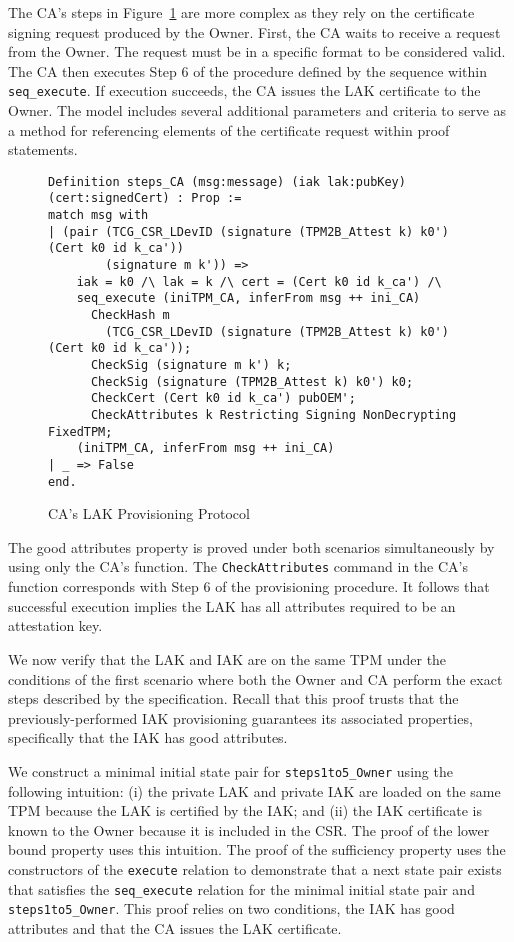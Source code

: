 \documentclass[runningheads]{llncs}
\begin{document}
The CA's steps in Figure~\ref{fig:lak_model_CA} are more complex as
they rely on the certificate signing request produced by the Owner. 
First, the CA waits to receive a request from the
Owner. The request must be in a specific
format to be considered valid. The CA then executes Step 6 of the
procedure defined by the sequence within \verb|seq_execute|. If
execution succeeds, the CA issues the LAK certificate to the Owner.
The model includes several additional parameters and criteria to serve
as a method for referencing elements of the certificate request
within proof statements.

\begin{figure}[hpbt]
\vspace{-\medskipamount}
\vspace{-\medskipamount}
\begin{lstlisting}[language=Coq]
Definition steps_CA (msg:message) (iak lak:pubKey) (cert:signedCert) : Prop :=
match msg with
| (pair (TCG_CSR_LDevID (signature (TPM2B_Attest k) k0') (Cert k0 id k_ca'))
        (signature m k')) =>
    iak = k0 /\ lak = k /\ cert = (Cert k0 id k_ca') /\
    seq_execute (iniTPM_CA, inferFrom msg ++ ini_CA)
      CheckHash m 
        (TCG_CSR_LDevID (signature (TPM2B_Attest k) k0') (Cert k0 id k_ca'));
      CheckSig (signature m k') k;
      CheckSig (signature (TPM2B_Attest k) k0') k0;
      CheckCert (Cert k0 id k_ca') pubOEM';
      CheckAttributes k Restricting Signing NonDecrypting FixedTPM;
    (iniTPM_CA, inferFrom msg ++ ini_CA)
| _ => False
end.
\end{lstlisting}
\caption{CA's LAK Provisioning Protocol}
\label{fig:lak_model_CA}
\end{figure}

The good attributes property is proved under both scenarios
simultaneously by using only the CA's function.  The
\verb|CheckAttributes| command in the CA's function corresponds with
Step 6 of the provisioning procedure.  It follows that successful
execution implies the LAK has all attributes required to be an
attestation key.

We now verify that the LAK and IAK are on the same TPM under the
conditions of the first scenario where both the Owner and CA perform 
the exact steps described by the specification. Recall that this proof
trusts that the previously-performed IAK provisioning guarantees its
associated properties, specifically that the IAK has good attributes.

We construct a minimal initial state pair for \verb|steps1to5_Owner|
using the following intuition: (i) the private LAK and private IAK are
loaded on the same TPM because the LAK is certified by the IAK; and
(ii) the IAK certificate is known to the Owner because it is included
in the CSR.  The proof of the lower bound property uses this
intuition.  The proof of the sufficiency property uses the
constructors of the \verb|execute| relation to demonstrate that a next
state pair exists that satisfies the \verb|seq_execute| relation for
the minimal initial state pair and \verb|steps1to5_Owner|. This proof
relies on two conditions, the IAK has good attributes and that the CA
issues the LAK certificate.
\end{document}
